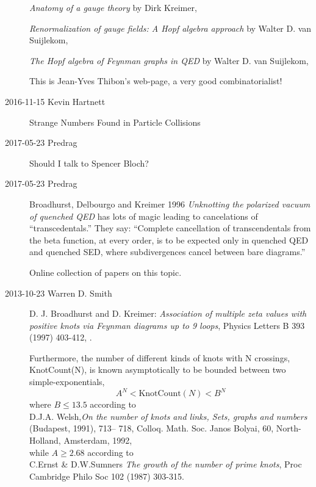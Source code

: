 \begin{description}
\emph{Anatomy of a gauge theory} by
Dirk Kreimer,

\emph{Renormalization of gauge fields: A Hopf algebra approach} by
Walter D. van Suijlekom,

\emph{The Hopf algebra of Feynman graphs in QED} by
Walter D. van Suijlekom,

This is Jean-Yves Thibon's
 {web-page},
a very good combinatorialist!

\item[2016-11-15 Kevin Hartnett]
{Strange Numbers Found in Particle Collisions}

\item[2017-05-23 Predrag] Should I talk to
 {Spencer Bloch}?

\item[2017-05-23 Predrag]
Broadhurst, Delbourgo and Kreimer 1996
{\em Unknotting the polarized vacuum of quenched {QED}} has
lots of magic leading to cancelations of ``transcedentals.''
They say: ``Complete cancellation of transcendentals from the
beta function, at every order, is to be expected only in
quenched QED and quenched SED, where subdivergences
cancel between bare diagrams.''

 Online collection of papers on
 {this topic}.


\item[2013-10-23  Warren D. Smith]

D. J. Broadhurst and D. Kreimer:
\emph{Association of multiple zeta values with positive knots via Feynman
diagrams up to 9 loops},
Physics Letters B 393 (1997) 403-412,
.

Furthermore, the number of different kinds of knots with N crossings,
KnotCount(N), is known asymptotically to be bounded between two
simple-exponentials,
\[
A^N < \mbox{KnotCount}(N) < B^N
\]
where
$B\leq 13.5$ according to\\
   D.J.A. Welsh,{\em On the number of knots and links, Sets, graphs and
numbers} (Budapest, 1991), 713– 718, Colloq. Math. Soc. Janos Bolyai,
60, North-Holland, Amsterdam, 1992,
\\
while
$A\geq 2.68$ according to\\
C.Ernst \& D.W.Sumners {\em The growth of the number of prime knots},
Proc Cambridge Philo Soc 102 (1987) 303-315.


\end{description}
